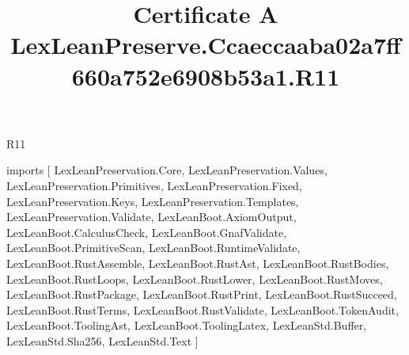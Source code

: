 \begin{lexlean}{R11}
\title{Certificate A LexLeanPreserve.Ccaeccaaba02a7ff660a752e6908b53a1.R11}
\begin{coremodule}
imports [
  LexLeanPreservation.Core,
  LexLeanPreservation.Values,
  LexLeanPreservation.Primitives,
  LexLeanPreservation.Fixed,
  LexLeanPreservation.Keys,
  LexLeanPreservation.Templates,
  LexLeanPreservation.Validate,
  LexLeanBoot.AxiomOutput,
  LexLeanBoot.CalculusCheck,
  LexLeanBoot.GnafValidate,
  LexLeanBoot.PrimitiveScan,
  LexLeanBoot.RuntimeValidate,
  LexLeanBoot.RustAssemble,
  LexLeanBoot.RustAst,
  LexLeanBoot.RustBodies,
  LexLeanBoot.RustLoops,
  LexLeanBoot.RustLower,
  LexLeanBoot.RustMoves,
  LexLeanBoot.RustPackage,
  LexLeanBoot.RustPrint,
  LexLeanBoot.RustSucceed,
  LexLeanBoot.RustTerms,
  LexLeanBoot.RustValidate,
  LexLeanBoot.TokenAudit,
  LexLeanBoot.ToolingAst,
  LexLeanBoot.ToolingLatex,
  LexLeanStd.Buffer,
  LexLeanStd.Sha256,
  LexLeanStd.Text
]


\end{coremodule}
\end{lexlean}
